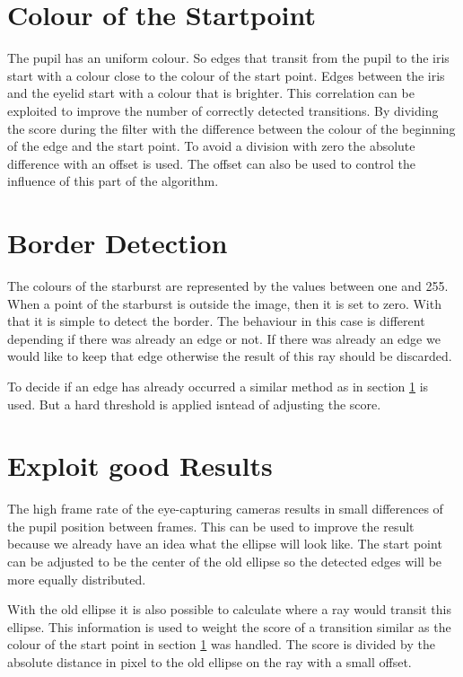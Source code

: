 \section{Colour of the Startpoint}
\label{sec:colorStartpoint}
The pupil has an uniform colour. So edges that transit from the pupil to the iris start with a colour close to the colour of the start point. Edges between the iris and the eyelid start with a colour that is brighter. This correlation can be exploited to improve the number of correctly detected transitions. By dividing the score during the filter with the difference between the colour of the beginning of the edge and the start point. To avoid a division with zero the absolute difference with an offset is used. The offset can also be used to control the influence of this part of the algorithm. 
\section{Border Detection}
\label{sec:randdetektion}
The colours of the starburst are represented by the values between one and 255. When a point of the starburst is outside the image, then it is set to zero. With that it is simple to detect the border. The behaviour in this case is different depending if there was already an edge or not. If there was already an edge we would like to keep that edge otherwise the result of this ray should be discarded.

To decide if an edge has already occurred a similar method as in section \ref{sec:colorStartpoint} is used. But a hard threshold is applied isntead of adjusting the score.
\section{Exploit good Results}
\label{sec:goodResults}

The high frame rate of the eye-capturing cameras results in small differences of the pupil position between frames. This can be used to improve the result because we already have an idea what the ellipse will look like. The start point can be adjusted to be the center of the old ellipse so the detected edges will be more equally distributed.

With the old ellipse it is also possible to calculate where a ray would transit this ellipse. This information is used to weight the score of a transition similar as the colour of the start point in section \ref{sec:colorStartpoint} was handled. The score is divided by the absolute distance in pixel to the old ellipse on the ray with a small offset.

